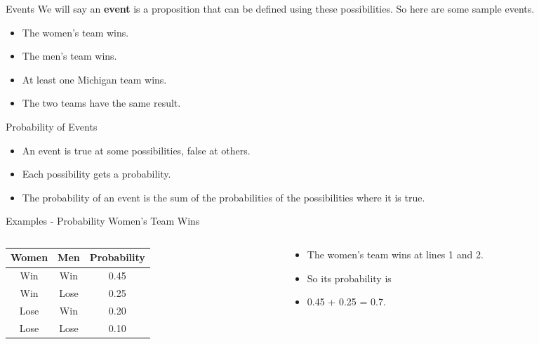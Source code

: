 \documentclass[
  ignorenonframetext,
]{beamer}
\providecommand{\tightlist}{%
  \setlength{\itemsep}{0pt}\setlength{\parskip}{0pt}}
\renewcommand{\,}{\text{, }}
\begin{document}
\begin{frame}{Events}
\protect\hypertarget{events}{}
We will say an \textbf{event} is a proposition that can be defined using
these possibilities. So here are some sample events.

\begin{itemize}
\tightlist
\item
  The women's team wins.
\item
  The men's team wins.
\item
  At least one Michigan team wins.
\item
  The two teams have the same result.
\end{itemize}
\end{frame}

\begin{frame}{Probability of Events}
\protect\hypertarget{probability-of-events}{}
\begin{itemize}
\tightlist
\item
  An event is true at some possibilities, false at others.
\item
  Each possibility gets a probability.
\item
  The probability of an event is the sum of the probabilities of the
  possibilities where it is true.
\end{itemize}
\end{frame}

\begin{frame}{Examples - Probability Women's Team Wins}
\protect\hypertarget{examples---probability-womens-team-wins}{}
\begin{columns}[T]
\begin{column}{0.48\textwidth}
\begin{longtable}[]{@{}ccc@{}}
\toprule
Women & Men & Probability \\
\midrule
\endhead
Win & Win & 0.45 \\
Win & Lose & 0.25 \\
Lose & Win & 0.20 \\
Lose & Lose & 0.10 \\
\bottomrule
\end{longtable}
\end{column}

\begin{column}{0.48\textwidth}
\bigskip

\begin{itemize}
\tightlist
\item
  The women's team wins at lines 1 and 2.
\item
  So its probability is
\item
  0.45 + 0.25 = 0.7.
\end{itemize}
\end{column}
\end{columns}
\end{frame}
\end{document}

